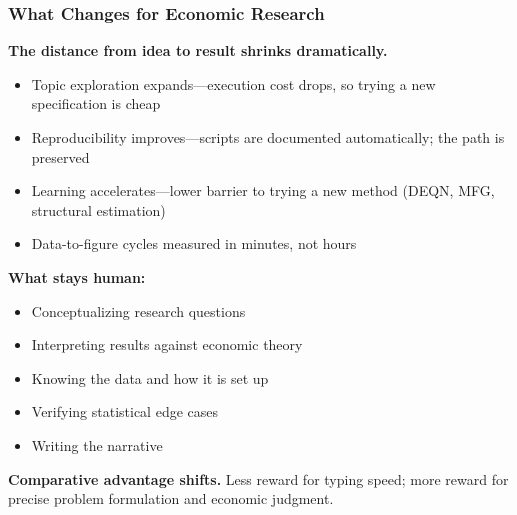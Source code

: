 \documentclass[10pt,english,aspectratio=169]{beamer}
\begin{document}
\begin{frame}
\frametitle{What Changes for Economic Research}

\textbf{The distance from idea to result shrinks dramatically.}

\vspace{0.3cm}

\begin{itemize}
    \item Topic exploration expands---execution cost drops, so trying a new specification is cheap
    \item Reproducibility improves---scripts are documented automatically; the path is preserved
    \item Learning accelerates---lower barrier to trying a new method (DEQN, MFG, structural estimation)
    \item Data-to-figure cycles measured in minutes, not hours
\end{itemize}

\vspace{0.3cm}

\textbf{What stays human:}
\begin{itemize}
    \item Conceptualizing research questions
    \item Interpreting results against economic theory
    \item Knowing the data and how it is set up
    \item Verifying statistical edge cases
    \item Writing the narrative
\end{itemize}

\vspace{0.2cm}

\textbf{Comparative advantage shifts.} Less reward for typing speed; more reward for precise problem formulation and economic judgment.
\end{frame}
\end{document}
